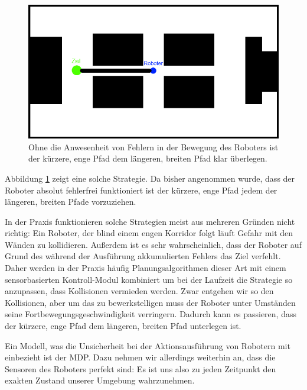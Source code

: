 \documentclass[a4paper]{IEEEtran}
\begin{document}
\begin{figure}[ht]
	\centering
	\includegraphics[scale=0.42]{images/autnmRobot_directPath.png}
	\caption{Ohne die Anwesenheit von Fehlern in der Bewegung des Roboters ist der kürzere, enge Pfad dem längeren, breiten Pfad klar überlegen.}
	\label{fig:holoch_autnmRob_dirPath}
\end{figure}
Abbildung \ref{fig:holoch_autnmRob_dirPath} zeigt eine solche Strategie. Da bisher angenommen wurde, dass der Roboter absolut fehlerfrei funktioniert ist der kürzere, enge Pfad jedem der längeren, breiten Pfade vorzuziehen.

In der Praxis funktionieren solche Strategien meist aus mehreren Gründen nicht richtig: Ein Roboter, der blind einem engen Korridor folgt läuft Gefahr mit den Wänden zu kollidieren. Außerdem ist es sehr wahrscheinlich, dass der Roboter auf Grund des während der Ausführung akkumulierten Fehlers das Ziel verfehlt. Daher werden in der Praxis häufig Planungsalgorithmen dieser Art mit einem sensorbasierten Kontroll-Modul kombiniert um bei der Laufzeit die Strategie so anzupassen, dass Kollisionen vermieden werden. Zwar entgehen wir so den Kollisionen, aber um das zu bewerkstelligen muss der Roboter unter Umständen seine Fortbewegungsgeschwindigkeit verringern. Dadurch kann es passieren, dass der kürzere, enge Pfad dem längeren, breiten Pfad unterlegen ist.

Ein Modell, was die Unsicherheit bei der Aktionsausführung von Robotern mit einbezieht ist der MDP. Dazu nehmen wir allerdings weiterhin an, dass die Sensoren des Roboters perfekt sind: Es ist uns also zu jeden Zeitpunkt den exakten Zustand unserer Umgebung wahrzunehmen.
\end{document}

